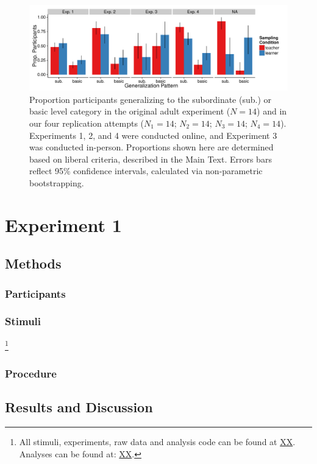 \documentclass[man]{apa2}
\begin{document}
 \begin{figure} [t]
 \begin{center} 
  \includegraphics[width=6.5in]{figures/FIG_2.pdf} 
  \caption{\label{fig:bar_plots} Proportion participants generalizing to the subordinate (sub.) or basic level category in the original adult experiment ($N = 14$) and in our four replication attempts ($N_{1} = 14$; $N_{2} = 14$; $N_{3}  = 14$; $N_{4}  = 14$).  Experiments 1, 2, and 4 were conducted online, and Experiment 3 was conducted in-person. Proportions shown here are determined based on liberal criteria, described in the Main Text. Errors bars reflect 95\% confidence intervals, calculated via non-parametric bootstrapping. } 
 \end{center} 
\end{figure}

  
\section{Experiment 1}

\subsection{Methods}

\subsubsection{Participants} 
\subsubsection{Stimuli}
\footnote{All stimuli, experiments, raw data and analysis code can be found at \url{XX}. 
Analyses can be found at: \url{XX}.} 


\subsubsection{Procedure}

\subsection{Results and Discussion}
\end{document}
